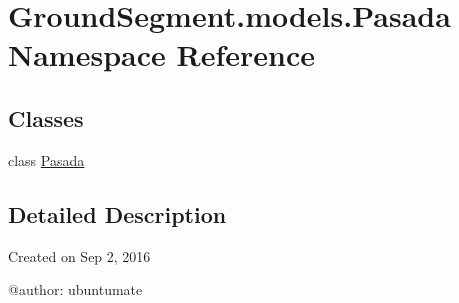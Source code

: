 \hypertarget{namespace_ground_segment_1_1models_1_1_pasada}{}\section{Ground\+Segment.\+models.\+Pasada Namespace Reference}
\label{namespace_ground_segment_1_1models_1_1_pasada}
\subsection*{Classes}
\begin{DoxyCompactItemize}
\item 
class \hyperlink{class_ground_segment_1_1models_1_1_pasada_1_1_pasada}{Pasada}
\end{DoxyCompactItemize}


\subsection{Detailed Description}
\begin{DoxyVerb}Created on Sep 2, 2016

@author: ubuntumate
\end{DoxyVerb}
 